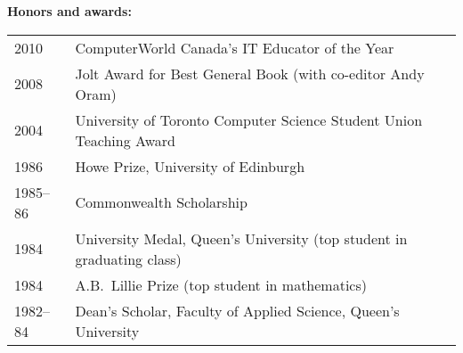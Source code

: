 \documentclass{proposalnsf}
\begin{document}
\textbf{Honors and awards:} 

\begin{tabular}{ll}
2010 & ComputerWorld Canada's IT Educator of the Year \\
2008 & Jolt Award for Best General Book (with co-editor Andy Oram) \\
2004 & University of Toronto Computer Science Student Union Teaching Award \\
1986 & Howe Prize, University of Edinburgh \\
1985--86 & Commonwealth Scholarship \\
1984 & University Medal, Queen's University (top student in graduating class) \\
1984 & A.B.\ Lillie Prize (top student in mathematics) \\
1982--84 & Dean's Scholar, Faculty of Applied Science, Queen's University \\
\end{tabular}
\end{document}
